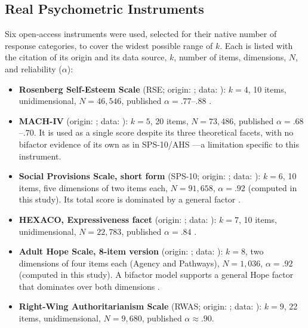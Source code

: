 \documentclass[man,mask,donotrepeattitle,floatsintext]{apa7}
\begin{document}
\subsection{Real Psychometric Instruments}
\label{sec:instruments}

Six open-access instruments were used, selected for their native number of response categories, to cover the widest possible range of $k$. Each is listed with the citation of its origin and its data source, $k$, number of items, dimensions, $N$, and reliability ($\alpha$):

\begin{itemize}
\item \textbf{Rosenberg Self-Esteem Scale} (RSE; origin: \cite{rosenberg1965}; data: \cite{osp2014rse}): $k=4$, 10 items, unidimensional, $N=46,546$, published $\alpha=.77$--$.88$ \parencite{blascovichtomaka1993,rosenberg1986}.
\item \textbf{MACH-IV} (origin: \cite{christiegeis1970}; data: \cite{osp2019mach}): $k=5$, 20 items, $N=73,486$, published $\alpha=.68$--$.70$. It is used as a single score despite its three theoretical facets, with no bifactor evidence of its own as in SPS-10/AHS —a limitation specific to this instrument.
\item \textbf{Social Provisions Scale, short form} (SPS-10; origin: \cite{cutronarussell1987}; data: \cite{yamada2021}): $k=6$, 10 items, five dimensions of two items each, $N=91,658$, $\alpha=.92$ (computed in this study). Its total score is dominated by a general factor \parencite{sischka2025}.
\item \textbf{HEXACO, Expressiveness facet} (origin: \cite{ashtonleegoldberg2007}; data: \cite{osp2014hexaco}): $k=7$, 10 items, unidimensional, $N=22,783$, published $\alpha=.84$ \parencite{ashtonleegoldberg2007}.
\item \textbf{Adult Hope Scale, 8-item version} (origin: \cite{snyder1991}; data: \cite{davis2021}): $k=8$, two dimensions of four items each (Agency and Pathways), $N=1,036$, $\alpha=.92$ (computed in this study). A bifactor model supports a general Hope factor that dominates over both dimensions \parencite{gomez2014}.
\item \textbf{Right-Wing Authoritarianism Scale} (RWAS; origin: \cite{altemeyer1981}; data: \cite{osp2016rwas}): $k=9$, 22 items, unidimensional, $N=9,680$, published $\alpha \approx .90$.
\end{itemize}
\end{document}
